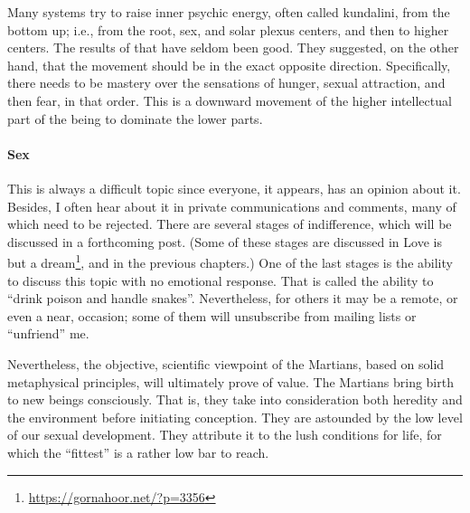 Many systems try to raise inner psychic energy, often called kundalini, from the bottom up; i.e., from the root, sex, and solar plexus centers, and then to higher centers. The results of that have seldom been good. They suggested, on the other hand, that the movement should be in the exact opposite direction. Specifically, there needs to be mastery over the sensations of hunger, sexual attraction, and then fear, in that order. This is a downward movement of the higher intellectual part of the being to dominate the lower parts.

\paragraph{Sex}


This is always a difficult topic since everyone, it appears, has an opinion about it. Besides, I often hear about it in private communications and comments, many of which need to be rejected. There are several stages of indifference, which will be discussed in a forthcoming post. (Some of these stages are discussed in Love is but a dream\footnote{\url{https://gornahoor.net/?p=3356}}, and in the previous chapters.) One of the last stages is the ability to discuss this topic with no emotional response. That is called the ability to ``drink poison and handle snakes''. Nevertheless, for others it may be a remote, or even a near, occasion; some of them will unsubscribe from mailing lists or ``unfriend'' me.

Nevertheless, the objective, scientific viewpoint of the Martians, based on solid metaphysical principles, will ultimately prove of value. The Martians bring birth to new beings consciously. That is, they take into consideration both heredity and the environment before initiating conception. They are astounded by the low level of our sexual development. They attribute it to the lush conditions for life, for which the ``fittest'' is a rather low bar to reach.

